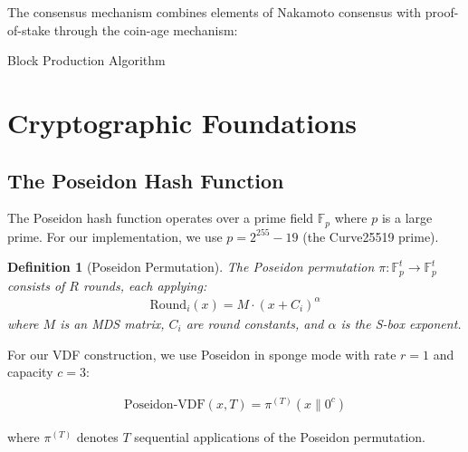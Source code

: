 \documentclass[11pt,a4paper]{article}
\newtheorem{definition}[theorem]{Definition}
\begin{document}
The consensus mechanism combines elements of Nakamoto consensus with proof-of-stake through the coin-age mechanism:

\begin{algorithm}[H]
\SetAlgoLined
{}
\caption{Block Production Algorithm}

\Return{$\perp$}\;
\end{algorithm}

\section{Cryptographic Foundations}

\subsection{The Poseidon Hash Function}

The Poseidon hash function operates over a prime field $\mathbb{F}_p$ where $p$ is a large prime. For our implementation, we use $p = 2^{255} - 19$ (the Curve25519 prime).

\begin{definition}[Poseidon Permutation]
The Poseidon permutation $\pi: \mathbb{F}_p^t \rightarrow \mathbb{F}_p^t$ consists of $R$ rounds, each applying:
\begin{align}
\text{Round}_i(x) = M \cdot (x + C_i)^{\alpha}
\end{align}
where $M$ is an MDS matrix, $C_i$ are round constants, and $\alpha$ is the S-box exponent.
\end{definition}

For our VDF construction, we use Poseidon in sponge mode with rate $r = 1$ and capacity $c = 3$:

\begin{align}
\text{Poseidon-VDF}(x, T) = \pi^{(T)}(x \| 0^c)
\end{align}

where $\pi^{(T)}$ denotes $T$ sequential applications of the Poseidon permutation.
\end{document}
